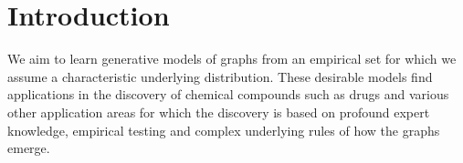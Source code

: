 \documentclass{article}
\title{\articleTitle}
\author{
	Julian Stier, Michael Granitzer\\
	University of Passau\\
	Innstraße 41, 94032 Passau, Germany\\
	\texttt{\articleEmail}
	\ifthenelse{\boolean{vc_is_included}}{\tiny\protect\\\VCDateTEX~~\GITAbrHash}{~}
}
\begin{document}
\maketitle

\begin{abstract}
	Learning distributions of graphs can be used for automatic drug discovery, molecular design, complex network analysis, and much more.
We present an improved framework for learning generative models of graphs based on the idea of deep state machines.
To learn state transition decisions we use a set of graph and node embedding techniques as memory of the state machine.

Our analysis is based on learning the distribution of random graph generators for which we provide statistical tests to determine which properties can be learned and how well the original distribution of graphs is represented.
We show that the design of the state machine favors specific distributions.
Models of graphs of size up to 150 vertices are learned.
Code and parameters are publicly available to reproduce our results.

 \end{abstract}

\maketitle

\section{Introduction}\label{sec:introduction}
We aim to learn generative models of graphs from an empirical set for which we assume a characteristic underlying distribution.
These desirable models find applications in the discovery of chemical compounds such as drugs and various other application areas for which the discovery is based on profound expert knowledge, empirical testing and complex underlying rules of how the graphs emerge.
\end{document}
